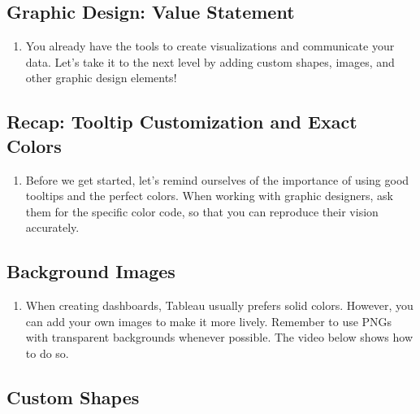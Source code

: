 \documentclass[
]{book}
\providecommand{\tightlist}{%
  \setlength{\itemsep}{0pt}\setlength{\parskip}{0pt}}
\begin{document}
\hypertarget{graphic-design-value-statement}{%
\subsection{Graphic Design: Value Statement}\label{graphic-design-value-statement}}

\begin{enumerate}
\def\labelenumi{\arabic{enumi}.}
\tightlist
\item
  You already have the tools to create visualizations and communicate your data. Let's take it to the next level by adding custom shapes, images, and other graphic design elements!
\end{enumerate}

\hypertarget{recap-tooltip-customization-and-exact-colors}{%
\subsection{Recap: Tooltip Customization and Exact Colors}\label{recap-tooltip-customization-and-exact-colors}}

\begin{enumerate}
\def\labelenumi{\arabic{enumi}.}
\tightlist
\item
  Before we get started, let's remind ourselves of the importance of using good tooltips and the perfect colors. When working with graphic designers, ask them for the specific color code, so that you can reproduce their vision accurately.
\end{enumerate}

\hypertarget{background-images}{%
\subsection{Background Images}\label{background-images}}

\begin{enumerate}
\def\labelenumi{\arabic{enumi}.}
\tightlist
\item
  When creating dashboards, Tableau usually prefers solid colors. However, you can add your own images to make it more lively. Remember to use PNGs with transparent backgrounds whenever possible. The video below shows how to do so.
\end{enumerate}

\hypertarget{custom-shapes}{%
\subsection{Custom Shapes}\label{custom-shapes}}
\end{document}
